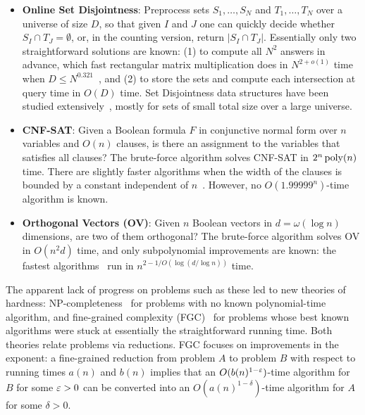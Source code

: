 \begin{itemize}
\item \textbf{Online Set Disjointness}: Preprocess sets $S_1,\dots,S_N$ and $T_1,\dots,T_N$ over a universe of size $D$, so that given $I$ and $J$ one can quickly decide whether $S_I\cap T_J=\emptyset$, or, in the counting version, return $|S_I\cap T_J|$. Essentially only two straightforward solutions are known: (1) to compute all $N^2$ answers in advance, which fast rectangular matrix multiplication does in $N^{2+o(1)}$ time when $D\le N^{0.321}$~\cite{Cop82,VXXZ24}, and (2) to store the sets and compute each intersection at query time in $O(D)$ time. Set Disjointness data structures have been studied extensively~\cite{CP10,KPP16,GKLP17b,KV20,GLP19}, mostly for sets of small total size over a large universe. 

\item \textbf{CNF-SAT}: Given a Boolean formula $F$ in conjunctive normal form over $n$ variables and $O(n)$ clauses, is there an assignment to the variables that satisfies all clauses? The brute-force algorithm solves CNF-SAT in $2^n\poly(n)$ time. There are slightly faster algorithms when the width of the clauses is bounded by a constant independent of $n$~\cite{Sch99,PPSZ05,Her14}. However, no $O(1.99999^n)$-time algorithm is known.

\item \textbf{Orthogonal Vectors (OV)}: Given $n$ Boolean vectors in $d=\omega(\log n)$ dimensions, are two of them orthogonal? The brute-force algorithm solves OV in $O(n^2d)$ time, and only subpolynomial improvements are known: the fastest algorithms~\cite{AWY15,CW21} run in $n^{2-1/O(\log(d/\log n))}$ time.
\end{itemize}






The apparent lack of progress on problems such as these led to new theories of hardness: NP-completeness~\cite{Coo71,Kar72} for problems with no known polynomial-time algorithm, and fine-grained complexity (FGC)~\cite{Vas18,Bri19} for problems whose best known algorithms were stuck at essentially the straightforward running time. Both theories relate problems via reductions. FGC focuses on improvements in the exponent: a fine-grained reduction from problem $A$ to problem $B$ with respect to running times $a(n)$ and $b(n)$ implies that an $O(b(n)^{1-\varepsilon})$-time algorithm for $B$ for some $\varepsilon>0$ can be converted into an $O(a(n)^{1-\delta})$-time algorithm for $A$ for some $\delta>0$. 




